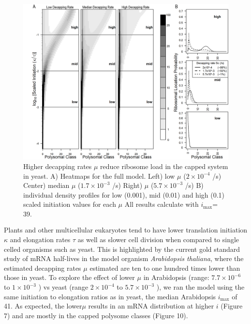 \documentclass[a4,center,fleqn]{NAR}
\newcommand{\imax}{\ensuremath{{i_{\max}}}\xspace}
\begin{document}
\begin{figure}[!ht]
\begin{center}
\includegraphics[width=140mm]{Images/2023-07-09_Figure2_Marking_Rate_range_medianlength_with_labels.png}
\caption{Higher decapping rates $\mu$ reduce ribosome load in the capped system in yeast.  A)  Heatmaps for the full model. Left) low $\mu$ ($2\times 10^{-4}$ /s) Center) median $\mu$ ($1.7\times 10^{-3}$ /s) Right) $\mu$ ($5.7\times 10^{-3}$ /s)  B) individual density profiles for low (0.001), mid (0.01) and high (0.1) scaled initiation values for each $\mu$ All results calculate with \imax = 39.}
\end{center}
\end{figure}


Plants and other multicellular eukaryotes tend to have lower translation initiation $\kappa$ and elongation rates $\tau$ as well as slower cell division when compared to single celled organisms such as yeast.
This is highlighted by the current gold standard study of mRNA half-lives in the model organism \textit{Arabidopsis thaliana}, where the estimated decapping rates $\mu$ estimated are ten to one hundred times lower than those in yeast. 
To explore the effect of lower $\mu$ in Arabidopsis (range: $7.7 \times 10^{-6}$ to $1 \times 10^{-3}$ ) vs yeast (range $2 \times 10^{-4}$ to $5.7 \times 10^{-3}$ ), we ran the model using the same initiation to elongation ratios as in yeast, the median Arabidopsis \imax of 41. 
As expected, the lower$\mu$ results in an mRNA distribution at higher $i$ (Figure 7) and are mostly in the capped polysome classes (Figure 10).
\end{document}
